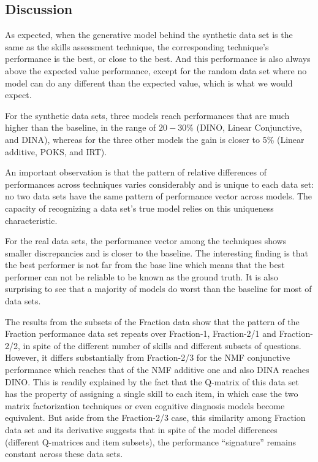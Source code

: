 \subsection{Discussion}

As expected, when the generative model behind the synthetic data set is the same as the skills assessment technique, the corresponding technique's performance is the best, or close to the best.  And this performance is also always above the expected value performance, except for the random data set where no model can do any different than the expected value, which is what we would expect.

For the synthetic data sets, three models reach performances that are much higher than the baseline, in the range of $20-30$\% (DINO, Linear Conjunctive, and DINA), whereas for the three other models the gain is closer to 5\% (Linear additive, POKS, and IRT).

An important observation is that the pattern of relative differences of performances across techniques varies considerably and is unique to each data set: no two data sets have the same pattern of performance vector across models.  The capacity of recognizing a data set's true model relies on this uniqueness characteristic.

For the real data sets, the performance vector among the techniques shows smaller discrepancies and is closer to the baseline. The interesting finding is that the best performer is not far from the base line which means that the best performer can not be reliable to be known as the ground truth. It is also surprising to see that a majority of models do worst than the baseline for most of data sets. 

The results from the subsets of the Fraction data show that the pattern of the Fraction performance data set repeats over Fraction-1, Fraction-2/1 and Fraction-2/2, in spite of the different number of skills and different subsets of questions.  However, it differs substantially from Fraction-2/3 for the NMF conjunctive performance which reaches that of the NMF additive one and also DINA reaches DINO. This is readily explained by the fact that the Q-matrix of this data set has the property of assigning a single skill to each item, in which case the two matrix factorization techniques or even cognitive diagnosis models become equivalent.  But aside from the Fraction-2/3 case, this similarity among Fraction data set and its derivative suggests that in spite of the model differences (different Q-matrices and item subsets), the performance ``signature'' remains constant across these data sets.

